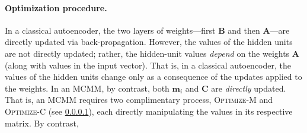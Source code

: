 %
%

\paragraph{Optimization procedure.}  In a classical autoencoder, the two layers of 
weights---first $\textbf{B}$ and then $\textbf{A}$---are directly updated via back-propagation. 
However, the values of the hidden units are not directly updated; rather, the hidden-unit values 
\emph{depend} on the weights $\textbf{A}$ (along with values in the input vector). 
That is, in a classical autoencoder, the values of the hidden units change only as a 
consequence of the updates applied to the weights. In an MCMM, by contrast, both $\textbf{m}_i$ and $\textbf{C}$ are \emph{directly} updated. That is, an MCMM requires two complimentary process, \textsc{Optimize-M} and \textsc{Optimize-C} (see \ref{}), each directly manipulating the values in its respective matrix. By contrast,






